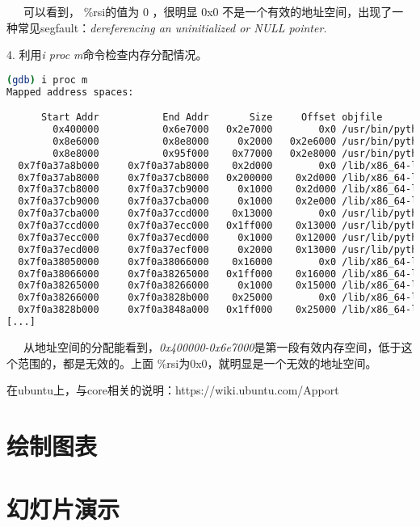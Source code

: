 \documentclass[12pt]{article}  %
\begin{document}
\ \ \ 可以看到， \%rsi的值为 0 ，很明显 0x0 不是一个有效的地址空间，出现了一种常见segfault：\emph{dereferencing an uninitialized or NULL pointer.}\par
4. 利用\emph{i proc m}命令检查内存分配情况。\par 
\begin{lstlisting}[language=sh]
(gdb) i proc m
Mapped address spaces:

      Start Addr           End Addr       Size     Offset objfile
        0x400000           0x6e7000   0x2e7000        0x0 /usr/bin/python2.7
        0x8e6000           0x8e8000     0x2000   0x2e6000 /usr/bin/python2.7
        0x8e8000           0x95f000    0x77000   0x2e8000 /usr/bin/python2.7
  0x7f0a37a8b000     0x7f0a37ab8000    0x2d000        0x0 /lib/x86_64-linux-gnu/libncursesw.so.5.9
  0x7f0a37ab8000     0x7f0a37cb8000   0x200000    0x2d000 /lib/x86_64-linux-gnu/libncursesw.so.5.9
  0x7f0a37cb8000     0x7f0a37cb9000     0x1000    0x2d000 /lib/x86_64-linux-gnu/libncursesw.so.5.9
  0x7f0a37cb9000     0x7f0a37cba000     0x1000    0x2e000 /lib/x86_64-linux-gnu/libncursesw.so.5.9
  0x7f0a37cba000     0x7f0a37ccd000    0x13000        0x0 /usr/lib/python2.7/lib-dynload/_curses.x86_64-linux-gnu.so
  0x7f0a37ccd000     0x7f0a37ecc000   0x1ff000    0x13000 /usr/lib/python2.7/lib-dynload/_curses.x86_64-linux-gnu.so
  0x7f0a37ecc000     0x7f0a37ecd000     0x1000    0x12000 /usr/lib/python2.7/lib-dynload/_curses.x86_64-linux-gnu.so
  0x7f0a37ecd000     0x7f0a37ecf000     0x2000    0x13000 /usr/lib/python2.7/lib-dynload/_curses.x86_64-linux-gnu.so
  0x7f0a38050000     0x7f0a38066000    0x16000        0x0 /lib/x86_64-linux-gnu/libgcc_s.so.1
  0x7f0a38066000     0x7f0a38265000   0x1ff000    0x16000 /lib/x86_64-linux-gnu/libgcc_s.so.1
  0x7f0a38265000     0x7f0a38266000     0x1000    0x15000 /lib/x86_64-linux-gnu/libgcc_s.so.1
  0x7f0a38266000     0x7f0a3828b000    0x25000        0x0 /lib/x86_64-linux-gnu/libtinfo.so.5.9
  0x7f0a3828b000     0x7f0a3848a000   0x1ff000    0x25000 /lib/x86_64-linux-gnu/libtinfo.so.5.9
[...]
\end{lstlisting}
\ \ \  从地址空间的分配能看到，\emph{0x400000-0x6e7000}是第一段有效内存空间，低于这个范围的，都是无效的。上面 \%rsi为0x0，就明显是一个无效的地址空间。

在ubuntu上，与core相关的说明：https://wiki.ubuntu.com/Apport
\section{绘制图表} %
\label{sec:绘制图表}
\section{幻灯片演示} %
\label{sec:幻灯片演示}
\end{document}
